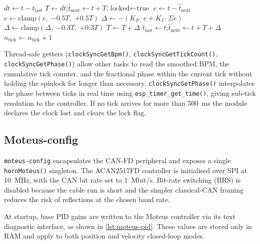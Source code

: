\begin{algorithm}[H]
	\caption{\texttt{processTick}($t$) --- PI clock recovery}
	\label{alg:processtick}
	\begin{algorithmic}[1]
		 \Return \EndIf
		\State $\mathit{dt} \gets t - t_\text{last}$
		 \Return \EndIf
		\State $T \gets \mathit{dt}$;\quad $\hat{t}_\text{next} \gets t + T$;\quad $\text{locked} \gets \text{true}$
		\State \Return
		\EndIf
		\State $e \gets t - \hat{t}_\text{next}$ 
		\State $e \gets \mathrm{clamp}(e,\; {-0.5T},\; {+0.5T})$ 
		\State $\Delta \gets -(K_P \cdot e + K_I \cdot \Sigma e)$
		\State $\Delta \gets \mathrm{clamp}(\Delta,\; {-0.3T},\; {+0.3T})$
		\State $T \gets T + \Delta$ 
		\State $t_\text{last} \gets t$;\quad $\hat{t}_\text{next} \gets t + T + \Delta$ 
		\State $n_\text{tick} \gets n_\text{tick} + 1$
	\end{algorithmic}
\end{algorithm}

Thread-safe getters (\texttt{clockSyncGetBpm()}, \texttt{clockSyncGetTickCount()}, \texttt{clockSyncGetPhase()})
allow other tasks to read the smoothed BPM, the cumulative tick counter, and the fractional
phase within the current tick without holding the spinlock for longer than necessary.
\texttt{clockSyncGetPhase()} interpolates the phase between ticks in real time using
\texttt{esp\_timer\_get\_time()}, giving sub-tick resolution to the controller.
If no tick arrives for more than 500~ms the module declares the clock lost and clears the lock flag.

\subsection{Moteus-config}
\texttt{moteus-config} encapsulates the CAN-FD peripheral and exposes a single \texttt{hornMoteus()} singleton.
The ACAN2517FD controller is initialised over SPI at 10~MHz, with the CAN bit rate set to 1~Mbit/s.
Bit-rate switching (BRS) is disabled because the cable run is short and the simpler classical-CAN framing
reduces the risk of reflections at the chosen baud rate.

At startup, base PID gains are written to the Moteus controller via its text diagnostic interface,
as shown in \autoref{lst:moteus-pid}.
These values are stored only in RAM and apply to both position and velocity closed-loop modes.

